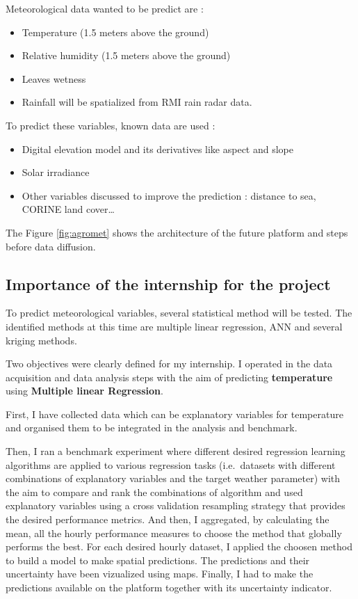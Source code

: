 \documentclass[12pt,twoside]{reedthesis}
\providecommand{\tightlist}{%
  \setlength{\itemsep}{0pt}\setlength{\parskip}{0pt}}
\theoremstyle{definition}
\theoremstyle{definition}
\theoremstyle{definition}
\theoremstyle{remark}
\begin{document}
Meteorological data wanted to be predict are :
\begin{itemize}
\tightlist
\item
  Temperature (1.5 meters above the ground)
\item
  Relative humidity (1.5 meters above the ground)
\item
  Leaves wetness
\item
  Rainfall will be spatialized from RMI rain radar data.
\end{itemize}
To predict these variables, known data are used :
\begin{itemize}
\tightlist
\item
  Digital elevation model and its derivatives like aspect and slope
\item
  Solar irradiance
\item
  Other variables discussed to improve the prediction : distance to sea,
  CORINE land cover\ldots{}
\end{itemize}
The Figure \ref{fig:agromet} shows the architecture of the future
platform and steps before data diffusion.

\subsection{Importance of the internship for the
project}\label{importance-of-the-internship-for-the-project}

To predict meteorological variables, several statistical method will be
tested. The identified methods at this time are multiple linear
regression, ANN and several kriging methods.

Two objectives were clearly defined for my internship. I operated in the
data acquisition and data analysis steps with the aim of predicting
\textbf{temperature} using \textbf{Multiple linear Regression}.

First, I have collected data which can be explanatory variables for
temperature and organised them to be integrated in the analysis and
benchmark.

Then, I ran a benchmark experiment where different desired regression
learning algorithms are applied to various regression tasks
(i.e.~datasets with different combinations of explanatory variables and
the target weather parameter) with the aim to compare and rank the
combinations of algorithm and used explanatory variables using a cross
validation resampling strategy that provides the desired performance
metrics. And then, I aggregated, by calculating the mean, all the hourly
performance measures to choose the method that globally performs the
best. For each desired hourly dataset, I applied the choosen method to
build a model to make spatial predictions. The predictions and their
uncertainty have been vizualized using maps. Finally, I had to make the
predictions available on the platform together with its uncertainty
indicator.
\end{document}
